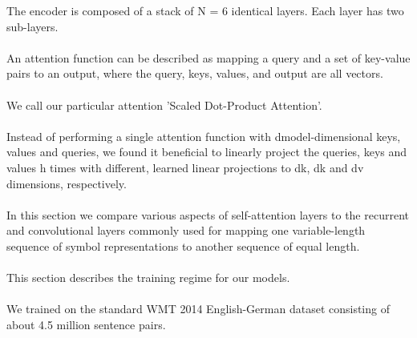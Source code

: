 \documentclass[11pt,a4paper]{article}
\begin{document}
The encoder is composed of a stack of N = 6 identical layers. Each layer has two sub-layers.


\paragraph{}

An attention function can be described as mapping a query and a set of key-value pairs to an output, where the query, keys, values, and output are all vectors.


\paragraph{}

We call our particular attention 'Scaled Dot-Product Attention'.


\paragraph{}

Instead of performing a single attention function with dmodel-dimensional keys, values and queries, we found it beneficial to linearly project the queries, keys and values h times with different, learned linear projections to dk, dk and dv dimensions, respectively.


\paragraph{}

In this section we compare various aspects of self-attention layers to the recurrent and convolutional layers commonly used for mapping one variable-length sequence of symbol representations to another sequence of equal length.


\paragraph{}

This section describes the training regime for our models.


\paragraph{}

We trained on the standard WMT 2014 English-German dataset consisting of about 4.5 million sentence pairs.
\end{document}
